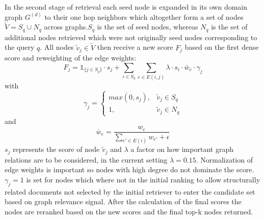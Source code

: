 \documentclass[11pt]{article}
\begin{document}
In the second stage of retrieval each seed node is expanded in its own domain graph $G^{(d)}$ to their one hop neighbors which altogether form a set of nodes $\tilde{V}=S_q\cup N_q$ across graphs.$S_q$ is the set of seed nodes, whereas $N_q$ is the set of additional nodes retrieved which were not originally seed nodes corresponding to the query $q$.
All nodes $\tilde{v}_j\in \tilde{V}$ then receive a new score $F_j$ based on the first dense score and reweighting of the edge weights: 
$$F_j = \mathbb{1}_{\{j\in S_q\}} \cdot s_j + \sum_{i \in S_q} \sum_{e\in E(i,j)} \lambda \cdot s_i \cdot \bar{w}_e \cdot \gamma_j$$ with 
$$\gamma_j = \begin{cases}
                max(0, s_j), & \tilde{v}_j\in S_q\\
                1, & \tilde{v}_j \in N_q
                \end{cases}$$ and
$$\bar{w}_e=\frac{w_e}{\sum_{e'\in E(i)}w_{e'} + \epsilon }$$
$s_j$ represents the score of node $\tilde{v}_j$ and $\lambda$ a factor on how important graph relations are to be considered, in the current setting $\lambda=0.15$. Normalization of edge weights is important so nodes with high degree do not dominate the score. $\gamma_j=1$ is set for nodes which where not in the initial ranking to allow structurally related documents not selected by the initial retriever to enter the candidate set based on graph relevance signal. After the calculation of the final scores the nodes are reranked based on the new scores and the final top-k nodes returned.
\end{document}
